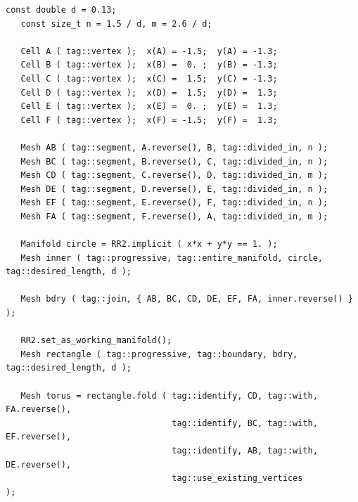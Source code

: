 \begin{Verbatim}[commandchars=\\\{\},formatcom=\small\tt,frame=single,
   label=parag-\ref{\numb section 7.\numb parag 15}.cpp,rulecolor=\color{coment},
   baselinestretch=0.94,framesep=2mm                                             ]
   const double d = 0.13;
   const size_t n = 1.5 / d, m = 2.6 / d;

   Cell A ( tag::vertex );  x(A) = -1.5;  y(A) = -1.3;
   Cell B ( tag::vertex );  x(B) =  0. ;  y(B) = -1.3;
   Cell C ( tag::vertex );  x(C) =  1.5;  y(C) = -1.3;
   Cell D ( tag::vertex );  x(D) =  1.5;  y(D) =  1.3;
   Cell E ( tag::vertex );  x(E) =  0. ;  y(E) =  1.3;
   Cell F ( tag::vertex );  x(F) = -1.5;  y(F) =  1.3;

   Mesh AB ( tag::segment, A.reverse(), B, tag::divided_in, n );
   Mesh BC ( tag::segment, B.reverse(), C, tag::divided_in, n );
   Mesh CD ( tag::segment, C.reverse(), D, tag::divided_in, m );
   Mesh DE ( tag::segment, D.reverse(), E, tag::divided_in, n );
   Mesh EF ( tag::segment, E.reverse(), F, tag::divided_in, n );
   Mesh FA ( tag::segment, F.reverse(), A, tag::divided_in, m );

   Manifold circle = RR2.implicit ( x*x + y*y == 1. );
   Mesh inner ( tag::progressive, tag::entire_manifold, circle, tag::desired_length, d );

   Mesh bdry ( tag::join, { AB, BC, CD, DE, EF, FA, inner.reverse() } );

   RR2.set_as_working_manifold();
   Mesh rectangle ( tag::progressive, tag::boundary, bdry, tag::desired_length, d );

   Mesh torus = rectangle.fold ( tag::identify, CD, tag::with, FA.reverse(),
                                 tag::identify, BC, tag::with, EF.reverse(),
                                 tag::identify, AB, tag::with, DE.reverse(),
                                 tag::use_existing_vertices                 );
\end{Verbatim}
  

